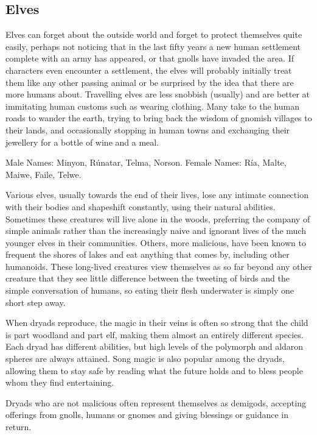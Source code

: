 \subsection{Elves}

Elves can forget about the outside world and forget to protect themselves quite easily, perhaps not noticing that in the last fifty years a new human settlement complete with an army has appeared, or that gnolls have invaded the area.  If characters even encounter a settlement, the elves will probably initially treat them like any other passing animal or be surprised by the idea that there are more humans about.  Travelling elves are less snobbish (usually) and are better at immitating human customs such as wearing clothing.  Many take to the human roads to wander the earth, trying to bring back the wisdom of gnomish villages to their lands, and occasionally stopping in human towns and exchanging their jewellery for a bottle of wine and a meal.

	Male Names: Minyon, R\'{u}natar, Telma, Norson.  Female Names: R\'{i}a, Malte, Maiwe, Faile, Telwe.

\label{dryad}
\dryad

Various elves, usually towards the end of their lives, lose any intimate connection with their bodies and shapeshift constantly, using their natural abilities.  Sometimes these creatures will live alone in the woods, preferring the company of simple animals rather than the increasingly naive and ignorant lives of the much younger elves in their communities.  Others, more malicious, have been known to frequent the shores of lakes and eat anything that comes by, including other humanoids.  These long-lived creatures view themselves as so far beyond any other creature that they see little difference between the tweeting of birds and the simple conversation of humans, so eating their flesh underwater is simply one short step away.

	When dryads reproduce, the magic in their veins is often so strong that the child is part woodland and part elf, making them almost an entirely different species.  Each dryad has different abilities, but high levels of the polymorph and aldaron spheres are always attained.  Song magic is also popular among the dryads, allowing them to stay safe by reading what the future holds and to bless people whom they find entertaining.

	Dryads who are not malicious often represent themselves as demigods, accepting offerings from gnolls, humans or gnomes and giving blessings or guidance in return.

